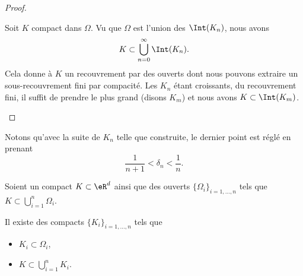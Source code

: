\begin{proof}
\begin{enumerate}
            Soit \( K\) compact dans \( \Omega\). Vu que \( \Omega\) est l'union des \( \Int(K_n)\), nous avons
            \begin{equation}
                K\subset\bigcup_{n=0}^{\infty}\Int(K_n).
            \end{equation}
            Cela donne à \( K\) un recouvrement par des ouverts dont nous pouvons extraire un sous-recouvrement fini par compacité. Les \( K_n\) étant croissants, du recouvrement fini, il suffit de prendre le plus grand (disons \( K_m\)) et nous avons \( K\subset\Int(K_m)\).
    \end{enumerate}
\end{proof}
Notons qu'avec la suite de \( K_n\) telle que construite, le dernier point est réglé en prenant
\begin{equation}
    \frac{1}{ n+1 }<\delta_n<\frac{1}{ n }.
\end{equation}


\begin{lemma}     \label{LEMooWRIXooSBHavt}
    Soient un compact \( K\subset \eR^d\) ainsi que des ouverts \( \{\Omega_i\}_{i=1,\ldots, n}\) tels que \( K\subset\bigcup_{i=1}^n\Omega_i\).

    Il existe des compacts \( \{ K_i \}_{i=1,\ldots, n}\) tels que 
    \begin{itemize}
        \item 
    \( K_i\subset \Omega_i\), 
    \item
    \( K\subset\bigcup_{i=1}^nK_i\).
    \end{itemize}
\end{lemma}

